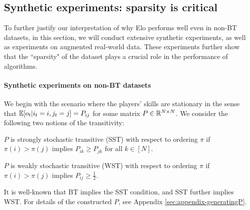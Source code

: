 \subsection{Synthetic experiments: sparsity is critical}
\label{sec:synthetic}
To further justify our interpretation of why Elo performs well even in non-BT datasets, in this section, we will conduct extensive synthetic experiments, as well as experiments on augmented real-world data. These experiments further show that the ``sparsity" of the dataset plays a crucial role in the performance of algorithms.



\paragraph{Synthetic experiments on non-BT datasets} We begin with the scenario where the players’ skills are stationary in the sense that $\mathbb{E}[o_t|i_t=i,j_t=j]=P_{ij}$ for some matrix $P\in\mathbb{R}^{N\times N}$. We consider the following two notions of the transitivity:

\begin{definition}[SST]
\label{def:sst}
$P$ is strongly stochastic transitive (SST) with respect to ordering $\pi$ if $\pi(i)>\pi(j)$ implies $P_{ik}\ge P_{jk}$ for all $k\in [N]$.
\end{definition}

\begin{definition}[WST]
\label{def:wst}
$P$ is weakly stochastic transitive (WST) with respect to ordering $\pi$ if $\pi(i)>\pi(j)$ implies $P_{ij}\ge \frac{1}{2}$.
\end{definition}
It is well-known that BT implies the SST condition, and SST further implies WST. For details of the constructed $P$, see Appendix \ref{sec:appendix-generatingP}.

